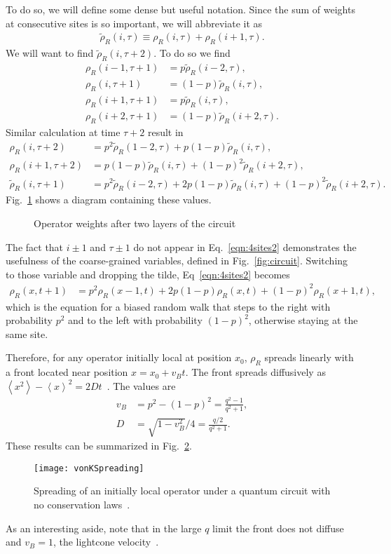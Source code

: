 \documentclass[a4paper,12pt]{article}
\newcommand{\ex}[1]{\left\langle #1 \right\rangle}
\renewcommand{\t}{\tau}
\newcommand{\nn}{\nonumber\\}
\begin{document}
To do so, we will define some dense but useful notation. Since the sum of weights at consecutive sites is so important, we will abbreviate it as
\begin{align}
\tilde{\rho}_R(i,\t) \equiv \rho_R(i,\tau) + \rho_R(i+1, \tau). \label{eqn:rhotil}
\end{align}
We will want to find $\tilde{\rho}_R(i,\t+2)$. To do so we find
\begin{align}
\rho_R(i-1, \t+1) &=    p  \tilde{\rho}_R(i-2, \t),\nn
\rho_R(i  , \t+1) &= (1-p) \tilde{\rho}_R(i  , \t),\nn
\rho_R(i+1, \t+1) &=    p  \tilde{\rho}_R(i  , \t),\nn
\rho_R(i+2, \t+1) &= (1-p) \tilde{\rho}_R(i+2, \t).\label{eqn:4sites1}
\end{align}
Similar calculation at time $\t+2$ result in
\begin{align}
\rho_R(i  , \t+2) &= p^2\tilde{\rho}_R(1-2,\t) + p(1-p)\tilde{\rho}_R(i,\t),\nn
\rho_R(i+1, \t+2) &= p(1-p)\tilde{\rho}_R(i,\t) + (1-p)^2\tilde{\rho}_R(i+2,
	\t), \nn
\tilde{\rho}_R(i,\t+1)&=p^2\tilde{\rho}_R(i-2,\t)+2p(1-p)\tilde{\rho}_R(i,\t)+
	(1-p)^2\tilde{\rho}_R(i+2,\t). \label{eqn:4sites2}
\end{align}
Fig.~\ref{fig:4sites} shows a diagram containing these values.
\begin{figure}
	\centering
	
	\caption{Operator weights after two layers of the circuit}
	\label{fig:4sites}
\end{figure}

The fact that $i\pm1$ and $\t\pm1$ do not appear in Eq.~\ref{eqn:4sites2} demonstrates the usefulness of the coarse-grained variables, defined in Fig.~\ref{fig:circuit}. Switching to those variable and dropping the tilde, Eq~\ref{eqn:4sites2} becomes
\begin{align}
\rho_R(x,t+1)&=p^2\rho_R(x-1,t)+2p(1-p)\rho_R(x,t)+(1-p)^2\rho_R(x+1,t), 
	\label{eqn:4sites3}
\end{align}
which is the equation for a biased random walk that steps to the right with probability $p^2$ and to the left with probability $(1-p)^2$, otherwise staying at the same site. 

Therefore, for any operator initially local at position $x_0$, $\rho_R$ spreads linearly with a front located near position $x = x_0 + v_B t$. The front spreads diffusively as $\ex{x^2}-\ex{x}^2=2Dt$~\cite{vonKeyserlingkHydro}. The values are
\begin{align}
v_B &= p^2-(1-p)^2 = \frac{q^2-1}{q^2+1},\nn
D   &= \sqrt{1-v_B^2}/4 = \frac{q/2}{q^2+1}.
\end{align}
These results can be summarized in Fig.~\ref{fig:vonKSpreading}.
\begin{figure}
	\centering
	\texttt{[image: vonKSpreading]}
	\caption{Spreading of an initially local operator under a quantum circuit with no conservation laws~\cite{vonKeyserlingkHydro}.}
	\label{fig:vonKSpreading}
\end{figure}
As an interesting aside, note that in the large $q$ limit the front does not diffuse and $v_B=1$, the lightcone velocity~\cite{NahumOpSp}.
\end{document}
